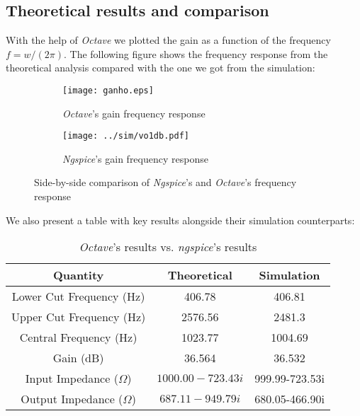 \subsection{Theoretical results and comparison}

With the help of \textit{Octave} we plotted the gain as a function of the frequency $f=w/(2\pi)$. The following figure shows the frequency response from the theoretical analysis compared with the one we got from the simulation:
\begin{figure}[H]
\centering
\begin{subfigure}{.5\textwidth}
  \centering
  \texttt{[image: ganho.eps]}
  \caption{\textit{Octave}'s gain frequency response}
  \label{fig:Ngspicegain(f)}
\end{subfigure}%
\begin{subfigure}{.5\textwidth}
  \centering
  \texttt{[image: ../sim/vo1db.pdf]}
  \caption{\textit{Ngspice}'s gain frequency response}
  \label{fig:Ngspicegain(f)}
\end{subfigure}
\caption{Side-by-side comparison of \textit{Ngspice}'s and \textit{Octave}'s frequency response}
\label{fig:Gaincomparison}
\end{figure}

We also present a table with key results alongside their simulation counterparts:

\begin{center}
    \begin{table}[H]
        \centering
        \begin{tabular}{c|c|c}
          \textbf{Quantity} & \textbf{Theoretical}  & \textbf{Simulation}  \\
          \hline

            Lower Cut Frequency (Hz) &  406.78 &  406.81 \\
            Upper Cut Frequency (Hz)&  2576.56 &  2481.3 \\
            Central Frequency (Hz)& 1023.77 &  1004.69 \\
            Gain (dB) &  36.564  & 36.532 \\
            Input Impedance ($\Omega$) & $1000.00-723.43i$ & 999.99-723.53i\\
            Output Impedance ($\Omega$) & $687.11-949.79i$ & 680.05-466.90i\\
        \end{tabular}
        \caption{\textit{Octave}'s results vs. \textit{ngspice}'s results}
    \end{table}
\end{center}
